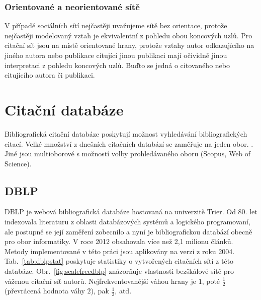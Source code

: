 \documentclass{bakalarka}
\begin{document}
\subsection{Orientované a neorientované sítě}
V případě sociálních sítí nejčastěji uvažujeme sítě bez orientace, protože
nejčastěji modelovaný vztah  je ekvivalentní z pohledu obou
koncových uzlů. Pro citační síť jsou na místě orientované hrany, protože vztahy
autor odkazujícího na jiného autora nebo publikace citující jinou publikaci
mají očividně jinou interpretaci z pohledu koncových uzlů. Buďto se jedná o
citovaného nebo citujícího autora či publikaci.


\chapter{Citační databáze}
Bibliografická citační databáze poskytují možnost vyhledávání bibliografických
citací. Velké množství z dnešních citačních databází se zaměřuje na jeden obor.
\citet{libraryamnh}.  Jiné jsou multioborové s možností volby prohledávaného
oboru (Scopus, Web of Science).

\section{DBLP}
DBLP \citet{DBLP} je webová bibliografická databáze hostovaná na univerzitě
Trier. Od 80.  let indexovala literaturu z oblasti databázových systémů a
logického programovaní, ale postupně se její zaměření zobecnilo a nyní je
bibliografickou databází obecně pro obor informatiky. 
V roce 2012 obsahovala více než 2,1 milionu článků. Metody implementované v
této práci jsou aplikovány na verzi z roku 2004. 
Tab.~\ref{tab:dblpstat} poskytuje statistiky o vytvořených citačních sítí z
této databáze.  Obr.~\ref{fig:scalefreedblp} znázorňuje vlastnosti bezškálové
sítě pro váženou citační síť autorů. Nejfrekventovanější váhou hrany je $1$,
poté $\frac{1}{2}$ (převrácená hodnota váhy $2$), pak $\frac{1}{3}$, atd.
\end{document}

